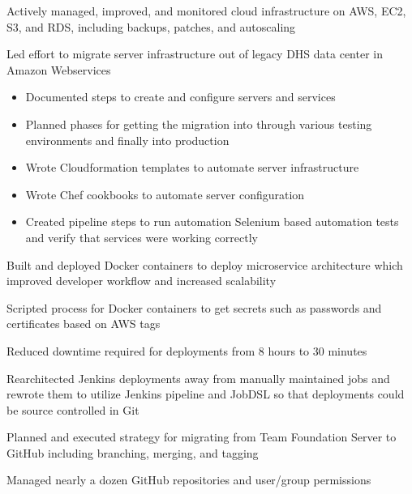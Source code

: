 \begin{cventries}
{\begin{cvitems}
        \item {Actively managed, improved, and monitored cloud infrastructure on AWS, EC2, S3, and RDS, including backups, patches, and autoscaling}
        \item {Led effort to migrate server infrastructure out of legacy DHS data center in Amazon Webservices}
        \begin{itemize}
          \item {Documented steps to create and configure servers and services}
          \item {Planned phases for getting the migration into through various testing environments and finally into production}
          \item {Wrote Cloudformation templates to automate server infrastructure}
          \item {Wrote Chef cookbooks to automate server configuration}
          \item {Created pipeline steps to run automation Selenium based automation tests and verify that services were working correctly}
        \end{itemize}
        \pagebreak
        \item {Built and deployed Docker containers to deploy microservice architecture which improved developer workflow and increased scalability}
        \item {Scripted process for Docker containers to get secrets such as passwords and certificates based on AWS tags}
        \item {Reduced downtime required for deployments from 8 hours to 30 minutes}
        \item {Rearchitected Jenkins deployments away from manually maintained jobs and rewrote them to utilize Jenkins pipeline and JobDSL so that deployments could be source controlled in Git}
        \item {Planned and executed strategy for migrating from Team Foundation Server to GitHub including branching, merging, and tagging}
        \item {Managed nearly a dozen GitHub repositories and user/group permissions}
      \end{cvitems}
    }



\end{cventries}
